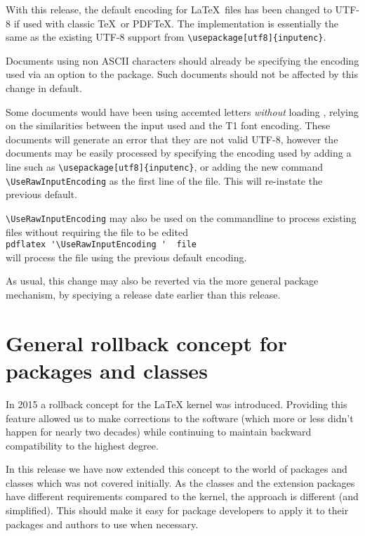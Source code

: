 \documentclass{ltnews}
\begin{document}
With this release, the default encoding for \LaTeX\ files has been
changed to UTF-8 if used with classic \TeX\ or PDF\TeX. The
implementation is essentially the same as the existing UTF-8 support
from \verb|\usepackage[utf8]{inputenc}|.

Documents using non ASCII characters should already be specifying the
encoding used via an option to the  package. Such
documents should not be affected by this change in default.

Some documents would have been using accemted letters \emph{without}
loading , relying on the similarities between the
input used and the T1 font encoding.  These documents will generate an
error that they are not valid UTF-8, however the documents may be
easily processed by specifying the encoding used by adding a line such
as \verb|\usepackage[utf8]{inputenc}|, or adding the new command
\verb|\UseRawInputEncoding| as the first line of the file. This will
re-instate the previous default.

\verb|\UseRawInputEncoding| may also be used on the commandline to
process existing files without requiring the file to be edited\\
  \verb|pdflatex '\UseRawInputEncoding '  file|\\
will process the file using the previous default encoding.

As usual, this change may also be reverted via the more general
 package mechanism, by speciying a release date
earlier than this release.

\section{General rollback concept for packages and classes}

  In 2015 a rollback concept for the \LaTeX{} kernel was introduced.
  Providing this feature allowed us to make corrections to the
  software (which more or less didn't happen for nearly two decades)
  while continuing to maintain backward compatibility to the highest
  degree.
  
  In this release we have now extended this concept to
  the world of packages and classes which was not covered
  initially. As the classes and the extension packages have different
  requirements compared to the kernel, the approach is different (and
  simplified). This should make it easy for package developers to
  apply it to their packages and authors to use when necessary.
\end{document}
